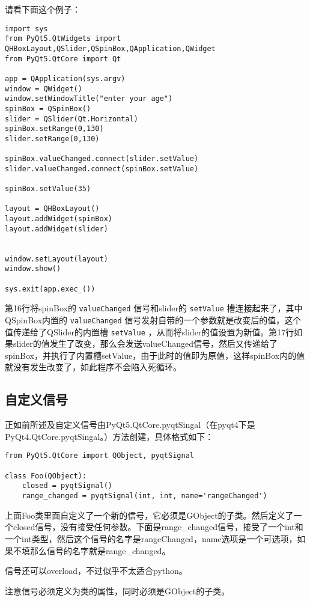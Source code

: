 \documentclass[11pt,oneside]{article}
\begin{document}
请看下面这个例子：
\begin{verbatim}
import sys
from PyQt5.QtWidgets import QHBoxLayout,QSlider,QSpinBox,QApplication,QWidget
from PyQt5.QtCore import Qt

app = QApplication(sys.argv)
window = QWidget()
window.setWindowTitle("enter your age")
spinBox = QSpinBox()
slider = QSlider(Qt.Horizontal)
spinBox.setRange(0,130)
slider.setRange(0,130)

spinBox.valueChanged.connect(slider.setValue)
slider.valueChanged.connect(spinBox.setValue)

spinBox.setValue(35)

layout = QHBoxLayout()
layout.addWidget(spinBox)
layout.addWidget(slider)


window.setLayout(layout)
window.show()

sys.exit(app.exec_())
\end{verbatim}

第16行将spinBox的 \texttt{valueChanged} 信号和slider的 \texttt{setValue} 槽连接起来了，其中QSpinBox内置的 \texttt{valueChanged} 信号发射自带的一个参数就是改变后的值，这个值传递给了QSlider的内置槽 \texttt{setValue} ，从而将slider的值设置为新值。第17行如果slider的值发生了改变，那么会发送valueChanged信号，然后又传递给了spinBox，并执行了内置槽setValue，由于此时的值即为原值，这样spinBox内的值就没有发生改变了，如此程序不会陷入死循环。


\subsection{自定义信号}
\label{sec:orgheadline19}
正如前所述及自定义信号由PyQt5.QtCore.pyqtSingal（在pyqt4下是PyQt4.QtCore.pyqtSingal。）方法创建，具体格式如下：
\begin{verbatim}
from PyQt5.QtCore import QObject, pyqtSignal

class Foo(QObject):
    closed = pyqtSignal()
    range_changed = pyqtSignal(int, int, name='rangeChanged')
\end{verbatim}

上面Foo类里面自定义了一个新的信号，它必须是GObject的子类。然后定义了一个closed信号，没有接受任何参数。下面是range\_changed信号，接受了一个int和一个int类型，然后这个信号的名字是rangeChanged，name选项是一个可选项，如果不填那么信号的名字就是range\_changed。

信号还可以overload，不过似乎不太适合python。

注意信号必须定义为类的属性，同时必须是GObject的子类。
\end{document}
